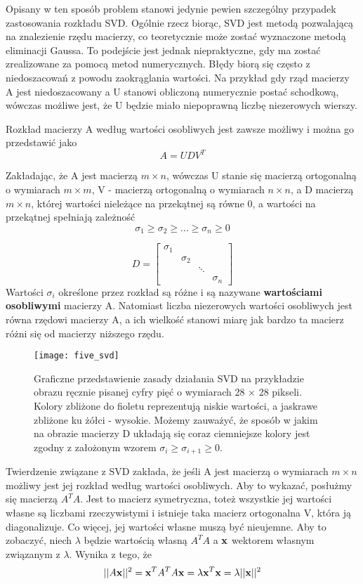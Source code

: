 \documentclass[12pt]{article}
\begin{document}
Opisany w ten sposób problem stanowi jedynie pewien szczególny przypadek zastosowania rozkładu SVD. Ogólnie rzecz biorąc, SVD jest metodą pozwalającą na znalezienie rzędu macierzy, co teoretycznie może zostać wyznaczone metodą eliminacji Gaussa. To podejście jest jednak niepraktyczne, gdy ma zostać zrealizowane za pomocą metod numerycznych. Błędy biorą się często z niedoszacowań z powodu zaokrąglania wartości. Na przykład gdy rząd macierzy A jest niedoszacowany a U stanowi obliczoną numerycznie postać schodkową, wówczas możliwe jest, że U będzie miało niepoprawną liczbę niezerowych wierszy.

Rozkład macierzy A według wartości osobliwych jest zawsze możliwy i można go przedstawić jako
\[A = UDV^T \]

Zakładając, że A jest macierzą $m \times n$, wówczas U stanie się macierzą ortogonalną o wymiarach $m \times m$, V - macierzą ortogonalną o wymiarach $n \times n$, a D macierzą $m \times n$, której wartości nieleżące na przekątnej są równe 0, a wartości na przekątnej spełniają zależność
\[\sigma_1 \geq \sigma_2 \geq \ldots \geq \sigma_n \geq 0\]

\[
D = \begin{bmatrix}
\sigma_1 & & & \\
& \sigma_2 & & \\
& & \ddots & \\
& & & \sigma_n
\end{bmatrix}
\]
Wartości $\sigma_i$ określone przez rozkład są różne i są nazywane \textbf{wartościami osobliwymi} macierzy A. Natomiast liczba niezerowych wartości osobliwych jest równa rzędowi macierzy A, a ich wielkość stanowi miarę jak bardzo ta macierz różni się od macierzy niższego rzędu. 

\begin{figure}[h]
\centering
\texttt{[image: five\_svd]}
\caption{Graficzne przedstawienie zasady działania SVD na przykładzie obrazu ręcznie pisanej cyfry pięć o wymiarach 28 $\times$ 28 pikseli. Kolory zbliżone do fioletu reprezentują niskie wartości, a jaskrawe zbliżone ku żółci - wysokie. Możemy zauważyć, że sposób w jakim na obrazie macierzy D układają się coraz ciemniejsze kolory jest zgodny z założonym wzorem $\sigma_i \geq \sigma_{i+1} \geq 0$.}
\end{figure}

Twierdzenie związane z SVD zakłada, że jeśli A jest macierzą o wymiarach $m \times n$ możliwy jest jej rozkład według wartości osobliwych. Aby to wykazać, posłużmy się macierzą $A^T A$. Jest to macierz symetryczna, toteż wszystkie jej wartości własne są liczbami rzeczywistymi i istnieje taka macierz ortogonalna V, która ją diagonalizuje. Co więcej, jej wartości własne muszą być nieujemne. Aby to zobaczyć, niech $\lambda$ będzie wartością własną $A^T A$ a $\vb{x}$ wektorem własnym związanym z $\lambda$. Wynika z tego, że
\[||A \vb{x}||^2 = \vb{x}^{T}A^T A\vb{x} = \lambda\vb{x}^T \vb{x} = \lambda||\vb{x}||^2 \]
\end{document}
